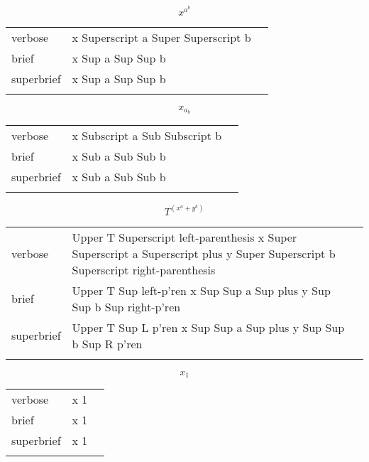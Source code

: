 \E \[x^{a^b}\]
\begin{longtable}[c]{@{}lll@{}}
\toprule\addlinespace
verbose & x Superscript a Super Superscript b &

\\\addlinespace
brief & x Sup a Sup Sup b &

\\\addlinespace
superbrief & x Sup a Sup Sup b &

\\\addlinespace
\bottomrule
\end{longtable}


\E \[x_{a_b}\]
\begin{longtable}[c]{@{}lll@{}}
\toprule\addlinespace
verbose & x Subscript a Sub Subscript b &

\\\addlinespace
brief & x Sub a Sub Sub b &

\\\addlinespace
superbrief & x Sub a Sub Sub b &

\\\addlinespace
\bottomrule
\end{longtable}


\E \[T^{\left(x^a+y^b\right)}\]
\begin{longtable}[c]{@{}lll@{}}
\toprule\addlinespace
verbose & Upper T Superscript left-parenthesis x Super Superscript a
Superscript plus y Super Superscript b Superscript right-parenthesis &

\\\addlinespace
brief & Upper T Sup left-p'ren x Sup Sup a Sup plus y Sup Sup b Sup
right-p'ren &

\\\addlinespace
superbrief & Upper T Sup L p'ren x Sup Sup a Sup plus y Sup Sup b Sup R
p'ren &

\\\addlinespace
\bottomrule
\end{longtable}


\R
\E \[x_1\]
\begin{longtable}[c]{@{}lll@{}}
\toprule\addlinespace
verbose & x 1 &

\\\addlinespace
brief & x 1 &

\\\addlinespace
superbrief & x 1 &

\\\addlinespace
\bottomrule
\end{longtable}


